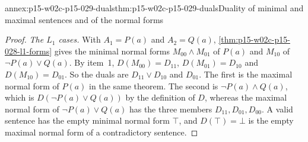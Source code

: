 \begin{annexitem}{annex:p15-w02c-p15-029-duals}{thm:p15-w02c-p15-029-duals}{Duality of minimal and maximal sentences and of the normal forms}
\begin{proof}
\emph{The \(L_1\) cases.} With \(A_1=P(a)\) and \(A_2=Q(a)\),
\cref{thm:p15-w02c-p15-028-l1-forms} gives the minimal normal forms
\(M_{00}\land M_{01}\) of \(P(a)\) and \(M_{10}\) of
\(\neg P(a)\lor Q(a)\). By item~1, \(D(M_{00})=D_{11}\),
\(D(M_{01})=D_{10}\) and \(D(M_{10})=D_{01}\). So the duals are
\(D_{11}\lor D_{10}\) and \(D_{01}\). The first is the maximal normal form
of \(P(a)\) in the same theorem. The second is \(\neg P(a)\land Q(a)\),
which is \(D(\neg P(a)\lor Q(a))\) by the definition of \(D\), whereas
the maximal normal form of \(\neg P(a)\lor Q(a)\) has the three members
\(D_{11},D_{01},D_{00}\). A valid sentence has the empty minimal normal
form \(\top\), and \(D(\top)=\bot\) is the empty maximal normal form of a
contradictory sentence.
\end{proof}
\end{annexitem}

